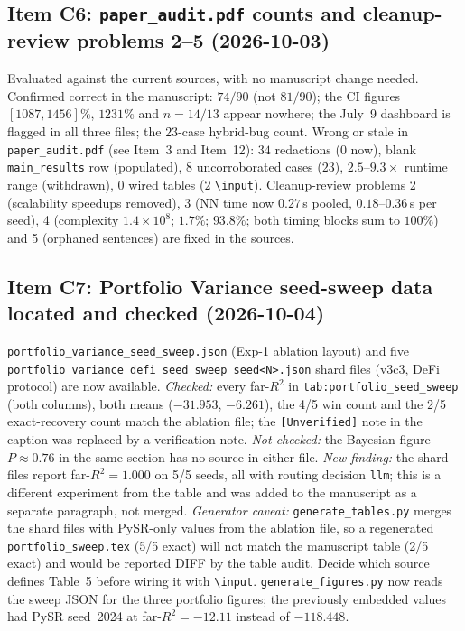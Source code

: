 \documentclass[11pt]{article}
\begin{document}
\subsection*{Item C6: \texttt{paper\_audit.pdf} counts and cleanup-review problems 2--5 (2026-10-03)}
Evaluated against the current sources, with no manuscript change needed. Confirmed correct in the manuscript: $74/90$
(not $81/90$); the CI figures $[1087,1456]\%$, $1231\%$ and $n=14/13$ appear nowhere; the July~9 dashboard is flagged in all
three files; the $23$-case hybrid-bug count. Wrong or stale in \texttt{paper\_audit.pdf} (see Item~3 and Item~12): $34$
redactions ($0$ now), blank \texttt{main\_results} row (populated), $8$ uncorroborated cases ($23$), $2.5$--$9.3\times$ runtime range
(withdrawn), $0$ wired tables ($2$ \texttt{\textbackslash input}). Cleanup-review problems 2 (scalability speedups removed),
3 (NN time now $0.27$\,s pooled, $0.18$--$0.36$\,s per seed), 4 (complexity $1.4\times10^{8}$; $1.7\%$; $93.8\%$; both timing
blocks sum to $100\%$) and 5 (orphaned sentences) are fixed in the sources.

\subsection*{Item C7: Portfolio Variance seed-sweep data located and checked (2026-10-04)}
\texttt{portfolio\_variance\_seed\_sweep.json} (Exp-1 ablation layout) and five
\texttt{portfolio\_variance\_defi\_seed\_sweep\_seed<N>.json} shard files (v3c3, DeFi protocol) are now available.
\emph{Checked:} every far-$R^2$ in \texttt{tab:portfolio\_seed\_sweep} (both columns), both means ($-31.953$, $-6.261$), the
4/5 win count and the 2/5 exact-recovery count match the ablation file; the \texttt{[Unverified]} note in the caption was
replaced by a verification note. \emph{Not checked:} the Bayesian figure $P\approx0.76$ in the same section has no source in
either file. \emph{New finding:} the shard files report far-$R^2=1.000$ on 5/5 seeds, all with routing decision
\texttt{llm}; this is a different experiment from the table and was added to the manuscript as a separate paragraph, not
merged. \emph{Generator caveat:} \texttt{generate\_tables.py} merges the shard files with PySR-only values from the ablation
file, so a regenerated \texttt{portfolio\_sweep.tex} (5/5 exact) will not match the manuscript table (2/5 exact) and
would be reported DIFF by the table audit. Decide which source defines Table~5 before wiring it with
\texttt{\textbackslash input}. \texttt{generate\_figures.py} now reads the sweep JSON for the three portfolio figures; the
previously embedded values had PySR seed~2024 at far-$R^2=-12.11$ instead of $-118.448$.
\end{document}
